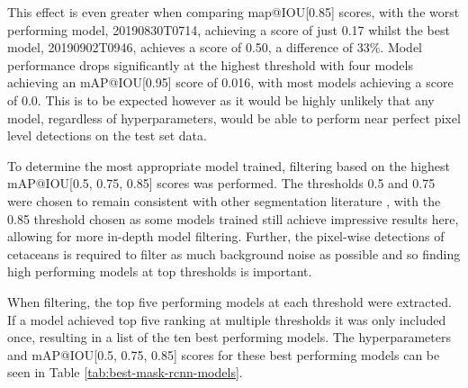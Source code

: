 This effect is even greater when comparing map@IOU[0.85] scores, with the worst performing model, 20190830T0714,  achieving a score of just 0.17 whilst the best model, 20190902T0946, achieves a score of 0.50, a difference of 33\%. Model performance drops significantly at the highest threshold with four models achieving an mAP@IOU[0.95] score of 0.016, with most models achieving a score of 0.0. This is to be expected however as it would be highly unlikely that any model, regardless of hyperparameters, would be able to perform near perfect pixel level detections on the test set data. 

To determine the most appropriate model trained, filtering based on the highest mAP@IOU[0.5, 0.75, 0.85] scores was performed. The thresholds 0.5 and 0.75 were chosen to remain consistent with other segmentation literature \cite{bolya_190402689_2019, wang_solov2_2020, tian_fcos_2019}, with the 0.85 threshold chosen as some models trained still achieve impressive results here, allowing for more in-depth model filtering. Further, the pixel-wise detections of cetaceans is required to filter as much background noise as possible and so finding high performing models at top thresholds is important.

When filtering, the top five performing models at each threshold were extracted. If a model achieved top five ranking at multiple thresholds it was only included once, resulting in a list of the ten best performing models. The hyperparameters and mAP@IOU[0.5, 0.75, 0.85] scores for these best performing models can be seen in Table \ref{tab:best-mask-rcnn-models}.

